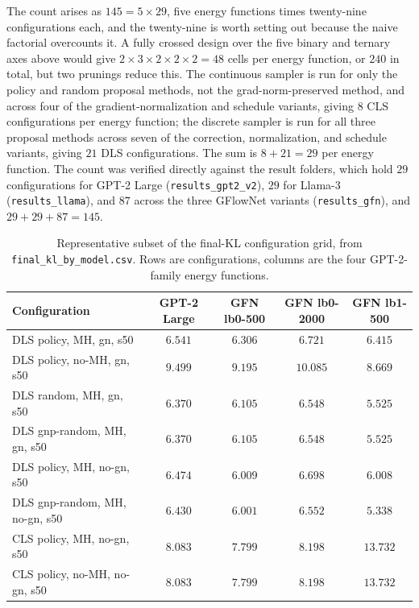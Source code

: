 The count arises as $145 = 5 \times 29$, five energy functions times twenty-nine configurations each, and the twenty-nine is worth setting out because the naive factorial overcounts it. A fully crossed design over the five binary and ternary axes above would give $2 \times 3 \times 2 \times 2 \times 2 = 48$ cells per energy function, or $240$ in total, but two prunings reduce this. The continuous sampler is run for only the policy and random proposal methods, not the grad-norm-preserved method, and across four of the gradient-normalization and schedule variants, giving $8$ CLS configurations per energy function; the discrete sampler is run for all three proposal methods across seven of the correction, normalization, and schedule variants, giving $21$ DLS configurations. The sum is $8 + 21 = 29$ per energy function. The count was verified directly against the result folders, which hold $29$ configurations for GPT-2 Large (\texttt{results\_gpt2\_v2}), $29$ for Llama-3 (\texttt{results\_llama}), and $87$ across the three GFlowNet variants (\texttt{results\_gfn}), and $29 + 29 + 87 = 145$.

\begin{table}[h]
    \centering
    \footnotesize
    \setlength{\tabcolsep}{4pt}
    \begin{tabular}{lcccc}
        \toprule
        Configuration & GPT-2 Large & GFN lb0-500 & GFN lb0-2000 & GFN lb1-500 \\
        \midrule
        DLS policy, MH, gn, s50        & $6.541$ & $6.306$ & $6.721$ & $6.415$ \\
        DLS policy, no-MH, gn, s50     & $9.499$ & $9.195$ & $10.085$ & $8.669$ \\
        DLS random, MH, gn, s50        & $6.370$ & $6.105$ & $6.548$ & $5.525$ \\
        DLS gnp-random, MH, gn, s50    & $6.370$ & $6.105$ & $6.548$ & $5.525$ \\
        DLS policy, MH, no-gn, s50     & $6.474$ & $6.009$ & $6.698$ & $6.008$ \\
        DLS gnp-random, MH, no-gn, s50 & $6.430$ & $6.001$ & $6.552$ & $5.338$ \\
        CLS policy, MH, no-gn, s50     & $8.083$ & $7.799$ & $8.198$ & $13.732$ \\
        CLS policy, no-MH, no-gn, s50  & $8.083$ & $7.799$ & $8.198$ & $13.732$ \\
        \bottomrule
    \end{tabular}
    \caption[Representative subset of the final-KL configuration grid.]{Representative subset of the final-KL configuration grid, from \texttt{final\_kl\_by\_model.csv}. Rows are configurations, columns are the four GPT-2-family energy functions.}
    \label{tab:full-grid}
\end{table}

